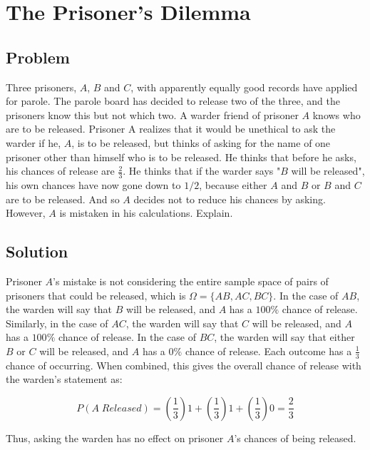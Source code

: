 \documentclass{article}
\date{}
\author{Kaan Aksoy | Feb 25, 2020}
\begin{document}
\maketitle
\section{The Prisoner's Dilemma}
\subsection{Problem}
Three prisoners, $A$, $B$ and $C$, with apparently equally good 
records have applied for parole. The parole board has decided to 
release two of the three, and the prisoners know this but not which 
two. A warder friend of prisoner $A$ knows who are to be released. 
Prisoner A realizes that it would be unethical to ask the warder if 
he, $A$, is to be released, but thinks of asking for the name of one 
prisoner other than himself who is to be released. He thinks that before 
he asks, his chances of release are $\frac{2}{3}$. He thinks that if the 
warder says "$B$ will be released", his own chances have now gone down 
to $1/2$, because either $A$ and $B$ or $B$ and $C$ are to be released. 
And so $A$ decides not to reduce his chances by asking.  However, $A$ 
is mistaken in his calculations. Explain.

\subsection{Solution}

Prisoner $A$'s mistake is not considering the entire sample space of pairs of 
prisoners that could be released, which is $\Omega = \{AB, AC, BC\}$. In the case of 
$AB$, the warden will say that $B$ will be released, and $A$ has a $100\%$ chance 
of release. Similarly, in the case of $AC$, the warden will say that $C$ will be 
released, and $A$ has a $100\%$ chance of release. In the case of $BC$, the warden 
will say that either $B$ or $C$ will be released, and $A$ has a $0\%$ chance of 
release. Each outcome has a $\frac{1}{3}$ chance of occurring. When combined, this 
gives the overall chance of release with the warden's statement as:

$$P(A\;Released) = \left(\frac{1}{3}\right)1 + \left(\frac{1}{3}\right)1
+ \left(\frac{1}{3}\right)0 = \frac{2}{3}$$

Thus, asking the warden has no effect on prisoner $A$'s chances of 
being released.
\end{document}
